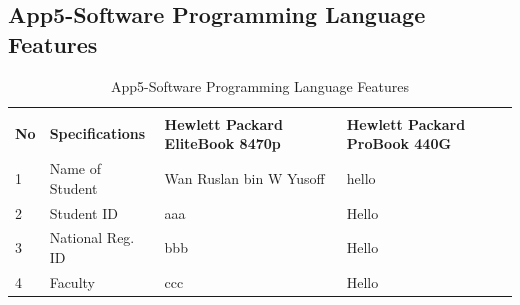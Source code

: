 \begin{landscape}
\subsection{App5-Software Programming Language Features}

	
	\begin{table}[ht]
		\begin{center}
			\caption{App5-Software Programming Language Features}		
			\label{table:App5-Software Programming Language Features}	
			
			\begin{tabular}{ |p{0.5cm}|p{5.0cm}|p{9.0cm}|p{9.0cm}|}
				\rowcolor{gray!10}			
				\hline \multicolumn{4}{|c|}{\textbf{Software Programming Language Features}} \\ [1.0ex]
				\rowcolor{gray!10}
				\hline \textbf{No} & \textbf{Specifications}    & \textbf{Hewlett Packard EliteBook 8470p} & \textbf{Hewlett Packard ProBook 440G}\\ 
				
				\hline 1 & Name of Student    & Wan Ruslan bin W Yusoff & hello\\ 
				\hline 2 & Student ID         &  aaa & Hello\\ 
				\hline 3 & National Reg. ID   & bbb  & Hello\\ 
				\hline 4 & Faculty            & ccc  & Hello\\ 
				
				\hline
			\end{tabular}
		\end{center}
	\end{table}  
	
	
\end{landscape}
\clearpage
